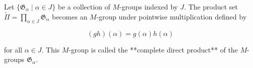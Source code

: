 Let $\{\mathfrak{G}_{\alpha} \mid \alpha \in J\}$ be a collection of $M$-groups indexed by $J$. The product set $\tilde{\Pi} = \prod_{\alpha \in J} \mathfrak{G}_{\alpha}$ becomes an $M$-group under pointwise multiplication defined by

$$(gh)(\alpha) = g(\alpha) h(\alpha)$$

for all $\alpha \in J$. This $M$-group is called the **complete direct product** of the $M$-groups $\mathfrak{G}_{\alpha}$.
